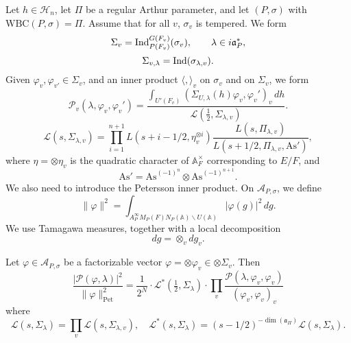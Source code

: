 \documentclass[reqno]{amsart} 
\begin{document}
Let $h \in \mathcal{H}_n$, let $\Pi$ be a regular Arthur parameter, and let $(P, \sigma)$ with $\mathrm{WBC} (P, \sigma) = \Pi $.  Assume that for all $v$, $\sigma_v$ is tempered.  We form
\begin{equation*}
\Sigma_v = \operatorname{Ind}_{P (F_v )}^{G (F_v )} (\sigma_v ), \qquad \lambda \in i \mathfrak{a}_P^\ast,
\end{equation*}
\begin{equation*}
\Sigma_{v, \lambda } = \operatorname{Ind} (\sigma_{\lambda, v}).
\end{equation*}
Given $\varphi_v, \varphi_{v '} \in \Sigma_v$, and an inner product $\langle ,  \rangle_v$ on $\sigma_v$ and on $\Sigma_v$, we form
\begin{equation*}
  \mathcal{P}_v (\lambda, \varphi_v, \varphi_v ')
  =
  \frac{\int_{U' (F_v )}
    \left( \Sigma_{U, \lambda } (h) \varphi_v, \varphi_v ' \right)_v \, d h
  }{
    \mathcal{L} (\tfrac{1}{2}, \Sigma_{\lambda, v})
  }.
\end{equation*}
\begin{equation*}
  \mathcal{L} (s, \Sigma_{\lambda, v}) = \prod_{i = 1 }^{n + 1}
  L (s + i - 1/2, \eta_v^{\otimes i})
  \frac{L (s, \Pi_{\lambda, v})}{ L (s + 1/2, \Pi_{\lambda, v}, \mathrm{As}')},
\end{equation*}
where $\eta = \otimes \eta_v$ is the quadratic character of $\mathbb{A}_F^\times $ corresponding to $E/F$, and
\begin{equation*}
\mathrm{As}' = \mathrm{As}^{(- 1 )^n } \otimes \mathrm{As}^{(- 1)^{n + 1}}.
\end{equation*}
We also need to introduce the Petersson inner product.  On $\mathcal{A}_{P, \sigma}$, we define
\begin{equation*}
  \lVert \varphi  \rVert^2 = \int_{
    A_P^\infty M_P (F) N_P (\mathbb{A} ) \backslash U (\mathbb{A})
  }
  \lvert \varphi (g) \rvert^2 \, d g.
\end{equation*}
We use Tamagawa measures, together with a local decomposition
\begin{equation*}
d g = \otimes_v d g_v.
\end{equation*}
\begin{theorem}
  Let $\varphi \in \mathcal{A}_{P, \sigma}$ be a factorizable vector $\varphi = \otimes \varphi_v \in \otimes \Sigma_v$.  Then
  \begin{equation*}
    \frac{\lvert \mathcal{P} (\varphi, \lambda ) \rvert^2 }{ \lVert \varphi  \rVert^2_{\mathrm{Pet}}}
    = \frac{1}{2^N }
    \cdot
    \mathcal{L}^\ast (\tfrac{1}{2}, \Sigma_\lambda )
    \cdot
    \prod_v \frac{\mathcal{P} (\lambda, \varphi_v, \varphi_v )}{ (\varphi_v, \varphi_v )_v }
  \end{equation*}
  where
  \begin{equation*}
    \mathcal{L} (s, \Sigma_\lambda ) = \prod_v \mathcal{L} (s, \Sigma_{\lambda, v}),
    \quad
    \mathcal{L}^\ast (s, \Sigma_\lambda ) = (s - 1/2 )^{- \dim (\mathfrak{a}_{\Pi} )}
    \mathcal{L} (s, \Sigma_\lambda).
  \end{equation*}  
\end{theorem}
\end{document}

